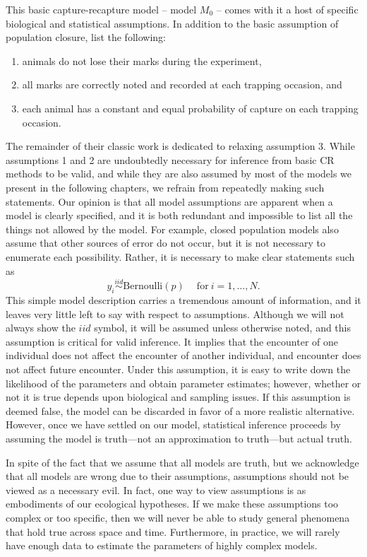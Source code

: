 This  basic capture-recapture model -- model $M_{0}$ -- comes with it
a host of specific biological and statistical assumptions.
In addition to the basic assumption of population closure,
\citet{otis_etal:1978} list the following:
\begin{enumerate}
  \item animals do not lose their marks during the experiment,
  \item all marks are correctly noted and recorded at each trapping
    occasion, and
  \item each animal has a constant and equal probability of capture on
    each trapping occasion.
\end{enumerate}
The remainder of their classic work is dedicated to relaxing
assumption 3. While assumptions 1 and 2 are undoubtedly necessary for
inference from basic CR methods to be valid, and while they are
also assumed by most of the models we present in the following
chapters, we refrain from repeatedly making such statements. Our
opinion is that all model assumptions are apparent when a model is
clearly specified, and it is both redundant and impossible to list all
the things not allowed by the model. For example, closed population
models also assume that other sources of error do not occur, but
it is not necessary to enumerate each possibility. Rather, it is
necessary to make clear statements such as
\[
y_i \stackrel{iid}{\sim} \text{Bernoulli}(p) \quad \: \text{for}\: i=1,\ldots,N.
\]
This simple model description carries a tremendous amount of
information, and it leaves very little left to say with respect to
assumptions. Although we will not always show the $iid$ symbol, it
will be assumed unless otherwise noted, and this assumption is
critical for valid inference. It implies that the encounter of one
individual does not affect the encounter of another
individual, and encounter does not affect future encounter. Under this assumption, it is  easy to write down the
likelihood of the parameters and obtain parameter estimates; however,
whether or not it is true depends upon biological and sampling
issues. If this assumption is deemed false, the model can be discarded
in favor of a more realistic alternative. However, once we have
settled on our model, statistical inference proceeds by assuming the
model is truth---not an approximation to truth---but actual
truth.


In spite of the fact that we assume that all models are truth, but we
acknowledge that all models are wrong due to their assumptions,
assumptions should not be viewed as a necessary evil. In fact, one way
to view assumptions is as embodiments of our ecological hypotheses. If
we make these assumptions too complex or too specific, then we will
never be able to study general phenomena that hold true across space
and time. Furthermore, in practice, we will rarely have enough data to estimate the
parameters of highly complex models.




